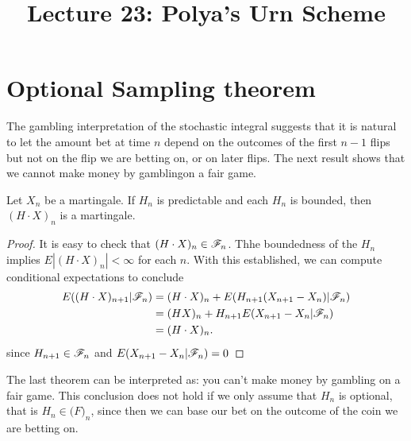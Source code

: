\documentclass[a4paper,english,10pt]{article}
\title{Lecture 23: Polya's Urn Scheme}
\author{}
\begin{document}
\maketitle
\section{Optional Sampling theorem}
The gambling interpretation of the stochastic integral suggests that it is natural to let the amount bet at time $n$ depend on the outcomes of the first $n-1$ flips but not on the flip we are betting on, or on later flips. The next result shows that we cannot make money by gamblingon a fair game.

\begin{thm}Let $X_n$ be a martingale. If $H_n$ is predictable and each $H_n$ is bounded, then $(H\cdot X)_n$ is a martingale.
\end{thm}
\begin{proof} It is easy to check that $(H\cdot X)_n \in \mathscr{F}_n$. Thhe boundedness of the $H_n$ implies $E|(H\cdot X)_n|<\infty$ for each $n$. With this established, we can compute conditional expectations to conclude
\begin{align*}
E((H\cdot X)_{n+1}| \mathscr{F}_n)&=(H\cdot X)_n+E(H_{n+1}(X_{n+1}-X_n)| \mathscr{F}_n)\\
       &=(HX)_n+H_{n+1}E(X_{n+1}-X_n| \mathscr{F}_n)\\
       &=(H\cdot X)_n.\qedhere
\end{align*}
since $H_{n+1}\in \mathscr{F}_n$ and $E(X_{n+1}-X_n| \mathscr{F}_n)=0$
\end{proof}
The last theorem can be interpreted as: you can't make money by gambling on a fair game. This conclusion does not hold if we only assume that $H_n$ is optional, that is $H_n\in \mathcal(F)_n$, since then we can base our bet on the outcome of the coin we are betting on.
\end{document}
